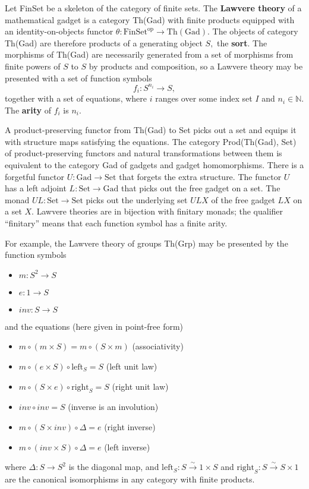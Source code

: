 \documentclass{article}
\newcommand{\maps}{\colon}
\newcommand{\FinSet}{\mathrm{FinSet}}
\newcommand{\Set}{\mathrm{Set}}
\newcommand{\Gad}{\mathrm{Gad}}
\newcommand{\op}{\mathrm{op}}
\newcommand{\NN}{\mathbb{N}}
\begin{document}
Let FinSet be a skeleton of the category of finite sets.  The {\bf Lawvere theory} of a mathematical gadget is a category Th(Gad) with finite products equipped with an identity-on-objects functor $\theta\maps \FinSet^\op \to \mathrm{Th(Gad)}.$  The objects of category Th(Gad) are therefore products of a generating object $S,$ the {\bf sort}.  The morphisms of Th(Gad) are necessarily generated from a set of morphisms from finite powers of $S$ to $S$ by products and composition, so a Lawvere theory may be presented with a set of function symbols
\[ f_i\maps S^{n_i} \to S, \]
together with a set of equations, where $i$ ranges over some index set $I$ and $n_i \in \NN$.  The {\bf arity} of $f_i$ is $n_i.$

A product-preserving functor from Th(Gad) to Set picks out a set and equips it with structure maps satisfying the equations.  The category Prod(Th(Gad), Set) of product-preserving functors and natural transformations between them is equivalent to the category Gad of gadgets and gadget homomorphisms.  There is a forgetful functor ${U\maps \Gad \to \Set}$ that forgets the extra structure.  The functor $U$ has a left adjoint ${L\maps \Set \to \Gad}$ that picks out the free gadget on a set.  The monad $UL\maps \Set \to \Set$ picks out the underlying set $ULX$ of the free gadget $LX$ on a set $X$.  Lawvere theories are in bijection with finitary monads; the qualifier ``finitary'' means that each function symbol has a finite arity.

For example, the Lawvere theory of groups Th(Grp) may be presented by the function symbols
\begin{itemize}
  \item $m\maps S^2 \to S$
  \item $e\maps 1 \to S$
  \item $inv \maps S \to S$
\end{itemize}
and the equations (here given in point-free form)
\begin{itemize}
  \item $m \circ (m \times S) = m \circ (S \times m)$ (associativity)
  \item $m \circ (e \times S) \circ \mathrm{left}_S = S$ (left unit law)
  \item $m \circ (S \times e) \circ \mathrm{right}_S = S$ (right unit law)
  \item $inv \circ inv = S$ (inverse is an involution)
  \item $m \circ (S \times inv) \circ \Delta = e$ (right inverse)
  \item $m \circ (inv \times S) \circ \Delta = e$ (left inverse)
\end{itemize}
where ${\Delta\maps S \to S^2}$ is the diagonal map, and ${\mathrm{left}_S\maps S \stackrel{\sim}{\to} 1 \times S}$ and ${\mathrm{right}_S\maps S \stackrel{\sim}{\to} S \times 1}$ are the canonical isomorphisms in any category with finite products.
\end{document}
